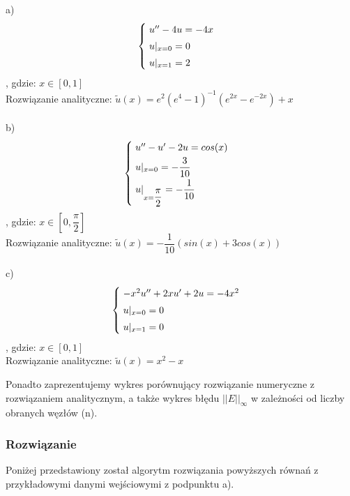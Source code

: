 a)
\[
\begin{cases}
\vspace{0.1cm} 
\hspace{0,1cm} u'' - 4u =-4x \\
\vspace{0.1cm}
\hspace{0,1cm}u|_{x=0} = 0 \\
\hspace{0,1cm}u|_{x=1} = 2
\end{cases}
\]
, gdzie:
$x\in[0,1]$
\\
Rozwiązanie analityczne: $\widetilde{u}(x) = e^2(e^4-1)^{-1} (e^{2x} - e^{-2x}) + x$
\\
\\
b)
\[
\begin{cases}
\vspace{0.1cm} 
\hspace{0,1cm} u'' -u'- 2u =cos(x) \\
\vspace{0.1cm}
\hspace{0,1cm}u|_{x=0} = -\dfrac{3}{10} \\
\hspace{0,1cm}u|_{x=\dfrac{\pi}{2}} = -\dfrac{1}{10}
\end{cases}
\]
, gdzie:
$x\in[0, \dfrac{\pi}{2}]$
\\
Rozwiązanie analityczne: $\widetilde{u}(x) = -\dfrac{1}{10}(sin(x) + 3cos(x))$
\\
\\
c)
\[
\begin{cases}
\vspace{0.1cm} 
\hspace{0,1cm} -x^2u'' +2xu' +2u=-4x^2 \\
\vspace{0.1cm}
\hspace{0,1cm}u|_{x=0} = 0 \\
\hspace{0,1cm}u|_{x=1} = 0
\end{cases}
\]
, gdzie:
$x\in[0,1]$
\\
Rozwiązanie analityczne: $\widetilde{u}(x) = x^2 - x$

\vspace{0.3cm}
Ponadto zaprezentujemy wykres porównujący rozwiązanie numeryczne z rozwiązaniem analitycznym, a także wykres błędu $||E||_{\infty}$ w zależności od liczby obranych węzłów (n).
\newpage
\subsubsection{Rozwiązanie}
Poniżej przedstawiony został algorytm rozwiązania powyższych równań z przykładowymi danymi wejściowymi z podpunktu a).


